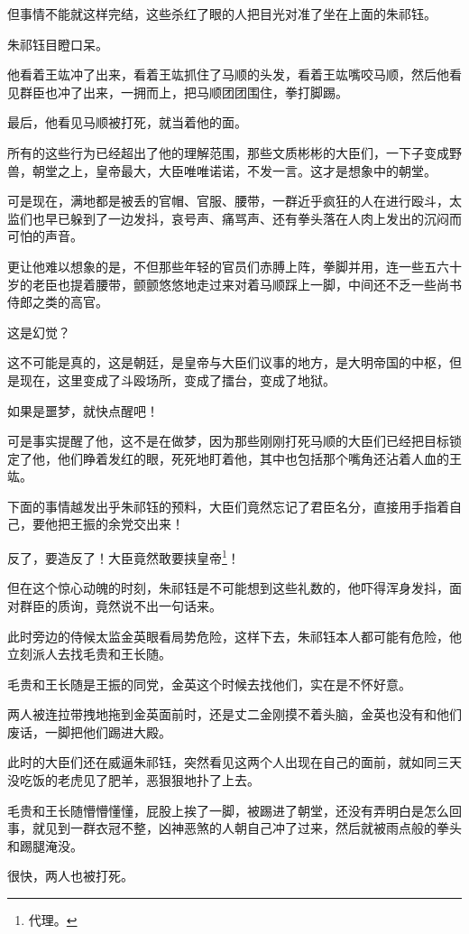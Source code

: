 \begin{multicols}{\theparacolNo}
但事情不能就这样完结，这些杀红了眼的人把目光对准了坐在上面的朱祁钰。

朱祁钰目瞪口呆。

他看着王竑冲了出来，看着王竑抓住了马顺的头发，看着王竑嘴咬马顺，然后他看见群臣也冲了出来，一拥而上，把马顺团团围住，拳打脚踢。

最后，他看见马顺被打死，就当着他的面。

所有的这些行为已经超出了他的理解范围，那些文质彬彬的大臣们，一下子变成野兽，朝堂之上，皇帝最大，大臣唯唯诺诺，不发一言。这才是想象中的朝堂。

可是现在，满地都是被丢的官帽、官服、腰带，一群近乎疯狂的人在进行殴斗，太监们也早已躲到了一边发抖，哀号声、痛骂声、还有拳头落在人肉上发出的沉闷而可怕的声音。

更让他难以想象的是，不但那些年轻的官员们赤膊上阵，拳脚并用，连一些五六十岁的老臣也提着腰带，颤颤悠悠地走过来对着马顺踩上一脚，中间还不乏一些尚书侍郎之类的高官。

这是幻觉？

这不可能是真的，这是朝廷，是皇帝与大臣们议事的地方，是大明帝国的中枢，但是现在，这里变成了斗殴场所，变成了擂台，变成了地狱。

如果是噩梦，就快点醒吧！

可是事实提醒了他，这不是在做梦，因为那些刚刚打死马顺的大臣们已经把目标锁定了他，他们睁着发红的眼，死死地盯着他，其中也包括那个嘴角还沾着人血的王竑。

下面的事情越发出乎朱祁钰的预料，大臣们竟然忘记了君臣名分，直接用手指着自己，要他把王振的余党交出来！

反了，要造反了！大臣竟然敢要挟皇帝\footnote{代理。}！

但在这个惊心动魄的时刻，朱祁钰是不可能想到这些礼数的，他吓得浑身发抖，面对群臣的质询，竟然说不出一句话来。

此时旁边的侍候太监金英眼看局势危险，这样下去，朱祁钰本人都可能有危险，他立刻派人去找毛贵和王长随。

毛贵和王长随是王振的同党，金英这个时候去找他们，实在是不怀好意。

两人被连拉带拽地拖到金英面前时，还是丈二金刚摸不着头脑，金英也没有和他们废话，一脚把他们踢进大殿。

此时的大臣们还在威逼朱祁钰，突然看见这两个人出现在自己的面前，就如同三天没吃饭的老虎见了肥羊，恶狠狠地扑了上去。

毛贵和王长随懵懵懂懂，屁股上挨了一脚，被踢进了朝堂，还没有弄明白是怎么回事，就见到一群衣冠不整，凶神恶煞的人朝自己冲了过来，然后就被雨点般的拳头和踢腿淹没。

很快，两人也被打死。


\end{multicols}
